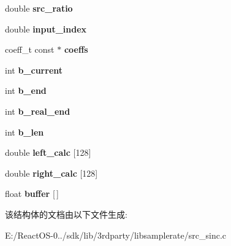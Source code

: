 \begin{DoxyCompactItemize}
double {\bfseries src\+\_\+ratio}
\item 
\mbox{\label{struct_s_i_n_c___f_i_l_t_e_r_af6c857c7a39ab714f3ec2951d80e5b7f}} 
double {\bfseries input\+\_\+index}
\item 
\mbox{\label{struct_s_i_n_c___f_i_l_t_e_r_a609c619ebc0ad0e546e4b2740e4a6bf2}} 
coeff\+\_\+t const  $\ast$ {\bfseries coeffs}
\item 
\mbox{\label{struct_s_i_n_c___f_i_l_t_e_r_acf329c12711fb6a4f039cc8b291e7d3e}} 
int {\bfseries b\+\_\+current}
\item 
\mbox{\label{struct_s_i_n_c___f_i_l_t_e_r_ac1d2f0a49231bef2bb36403be9391cb0}} 
int {\bfseries b\+\_\+end}
\item 
\mbox{\label{struct_s_i_n_c___f_i_l_t_e_r_a238d7f7847909f37faba232337e3b776}} 
int {\bfseries b\+\_\+real\+\_\+end}
\item 
\mbox{\label{struct_s_i_n_c___f_i_l_t_e_r_a55e77a24c10be0147fb0a4c206c3bfd6}} 
int {\bfseries b\+\_\+len}
\item 
\mbox{\label{struct_s_i_n_c___f_i_l_t_e_r_a877d0c30d7a7152fade45c4ce807a795}} 
double {\bfseries left\+\_\+calc} \mbox{[}128\mbox{]}
\item 
\mbox{\label{struct_s_i_n_c___f_i_l_t_e_r_a1c3b79180b4809d6d92864badf7a5d68}} 
double {\bfseries right\+\_\+calc} \mbox{[}128\mbox{]}
\item 
\mbox{\label{struct_s_i_n_c___f_i_l_t_e_r_a4cc6a238cd2ff5d6ea7d23d6917249a7}} 
float {\bfseries buffer} \mbox{[}$\,$\mbox{]}
\end{DoxyCompactItemize}


该结构体的文档由以下文件生成\+:\begin{DoxyCompactItemize}
\item 
E\+:/\+React\+O\+S-\/0../sdk/lib/3rdparty/libsamplerate/src\+\_\+sinc.\+c\end{DoxyCompactItemize}
